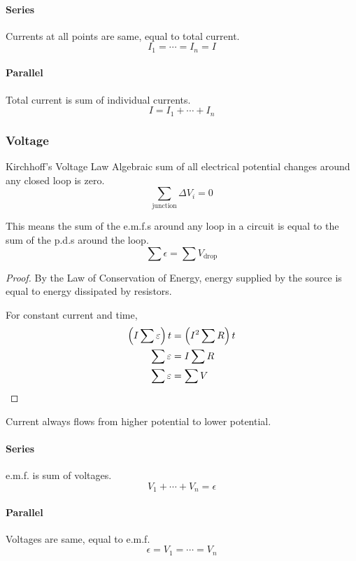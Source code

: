 \paragraph{Series}
Currents at all points are same, equal to total current.
\[ I_1=\cdots=I_n=I \]

\paragraph{Parallel}
Total current is sum of individual currents.
\[ I = I_1+\cdots+I_n \]

\subsubsection{Voltage}
\begin{defn}{Kirchhoff’s Voltage Law}{}
Algebraic sum of all electrical potential changes around any closed loop is zero.
\begin{equation}
\sum_{\text{junction}}\Delta V_i=0
\end{equation}
\end{defn}

This means the sum of the e.m.f.s around any loop in a circuit is equal to the sum of the p.d.s around the loop.
\[ \sum \epsilon = \sum V_\text{drop} \]

\begin{proof}
By the Law of Conservation of Energy, energy supplied by the source is equal to energy dissipated by resistors.

For constant current and time,
\begin{align*}
\left(I\sum\varepsilon\right)t &= \left(I^2\sum R\right)t \\
\sum\varepsilon &= I\sum R \\
\sum\varepsilon &= \sum V
\end{align*}
\end{proof}

\begin{remark}
Current always flows from higher potential to lower potential.
\end{remark}

\paragraph{Series}
e.m.f. is sum of voltages.
\[ V_1+\cdots+V_n = \epsilon \]

\paragraph{Parallel}
Voltages are same, equal to e.m.f.
\[ \epsilon = V_1=\cdots=V_n \]

